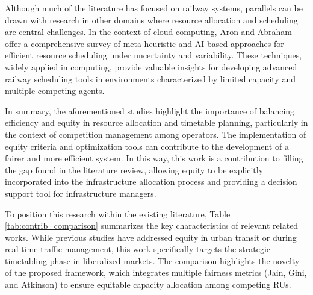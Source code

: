 \documentclass[preprint,12pt]{elsarticle}
\begin{document}
Although much of the literature has focused on railway systems, parallels can be drawn with research in other domains where resource allocation and scheduling are central challenges. In the context of cloud computing, Aron and Abraham \cite{Aron2022} offer a comprehensive survey of meta-heuristic and AI-based approaches for efficient resource scheduling under uncertainty and variability. These techniques, widely applied in computing, provide valuable insights for developing advanced railway scheduling tools in environments characterized by limited capacity and multiple competing agents. 

In summary, the aforementioned studies highlight the importance of balancing efficiency and equity in resource allocation and timetable planning, particularly in the context of competition management among operators. The implementation of equity criteria and optimization tools can contribute to the development of a fairer and more efficient system. In this way, this work is a contribution to filling the gap found in the literature review, allowing equity to be explicitly incorporated into the infrastructure allocation process and providing a decision support tool for infrastructure managers. 

To position this research within the existing literature, Table \ref{tab:contrib_comparison} summarizes the key characteristics of relevant related works. While previous studies have addressed equity in urban transit or during real-time traffic management, this work specifically targets the strategic timetabling phase in liberalized markets. The comparison highlights the novelty of the proposed framework, which integrates multiple fairness metrics (Jain, Gini, and Atkinson) to ensure equitable capacity allocation among competing \glspl{RU}.
\end{document}
